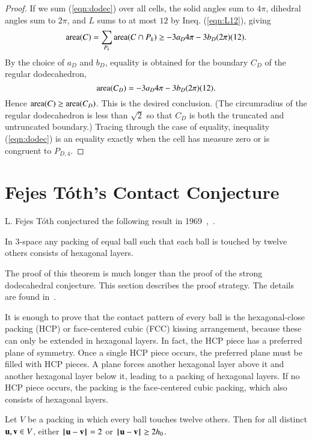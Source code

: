 \documentclass{llncs}
\def\area{\op{area}}
\begin{document}
\begin{proof}
If we sum (\ref{eqn:dodec}) over all cells, the solid angles sum to
$4\pi$, dihedral angles sum to $2\pi$, and $L$ sums to at most $12$ by
Ineq. (\ref{eqn:L12}), giving
\[
\area(C) = \sum_{P_k}\area(C\cap P_k) \ge -3 a_D 4\pi - 3 b_D (2\pi) (12).
\]
By the choice of $a_D$ and $b_D$, equality is obtained for the boundary
$C_D$ of the regular dodecahedron, 
\[
\area(C_D) = -3 a_D 4\pi - 3 b_D (2\pi) (12).
\]
Hence $\area(C)\ge \area(C_D)$. This is the desired conclusion.  (The
circumradius of the regular dodecahedron is less than $\sqrt2$ so that
$C_D$ is both the truncated and untruncated boundary.)  Tracing
through the case of equality, inequality (\ref{eqn:dodec}) is an
equality exactly when the cell has measure zero or is congruent to
$P_{D,4}$.
\end{proof}


\section{Fejes T\'oth's Contact Conjecture}


L. Fejes T\'oth conjectured the following result in
1969~\cite{Fejes-Toth:69},~\cite{Fejes-Toth:89}. 

\begin{theorem}
  In $3$-space any packing of equal ball such that each ball is touched
  by twelve others consists of hexagonal layers.
\end{theorem}

The proof of this theorem is much longer than the proof of the strong
dodecahedral conjecture.  This section describes the proof strategy.
The details are found in~\cite{DSP}.

It is enough to prove that the contact pattern of every ball is the
hexagonal-close packing (HCP) or face-centered cubic (FCC) kissing
arrangement, because these can only be extended in hexagonal layers.
In fact, the HCP piece has a preferred plane of symmetry.  Once a
single HCP piece occurs, the preferred plane must be filled with
HCP pieces.  A plane forces another hexagonal layer above it and another
hexagonal layer below it, leading to a packing of hexagonal layers.
If no HCP piece occurs, the packing is the face-centered cubic
packing, which also consists of hexagonal layers.

\begin{lemma} Let $V$ be a packing in which every ball touches twelve
  others.  Then for all distinct ${\mathbf u},{\mathbf v}\in V$, either
  $\norm{\u}{\v}=2$ or $\norm{\u}{\v}\ge 2h_0$.
\end{lemma}
\end{document}
